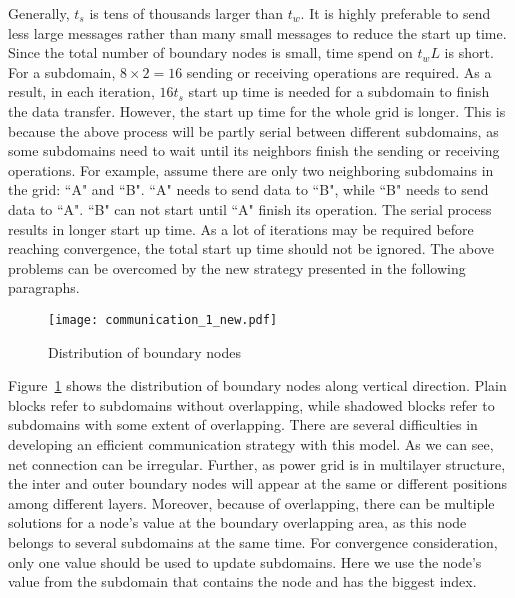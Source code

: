 \documentclass{sig-alternate}
\begin{document}
	Generally, $t_s$ is tens of thousands larger than $t_w$. It is highly preferable to send less 
	large messages rather than many small messages to reduce the start up time. Since the total number of boundary nodes is small, 
	time spend on $t_wL$ is short. For a subdomain, $8\times 2 = 
	16$ sending or receiving operations are required. As a result, in each iteration, $16t_s$ start up time is
	needed for a subdomain to finish the data transfer. However, the start up time for the whole grid is longer.
	This is because the above process will be partly serial between different subdomains, as some subdomains need to wait until
	its neighbors finish the sending or receiving operations. For example, 
	assume there are only two neighboring subdomains in the grid: ``A" and ``B". ``A" needs to send data to ``B", while ``B" needs
	to send data to ``A". ``B" can not start until ``A" finish its operation. The serial process results in 
	longer start up time. As a lot of iterations may be required before reaching convergence, the total 
	start up time should not be ignored. The above problems can be overcomed by the new strategy presented in the following paragraphs.

	\begin{figure}[htbp]
	  \centering
	  \texttt{[image: communication\_1\_new.pdf]}
	  \caption{Distribution of boundary nodes}
	  \label{comm}
	\end{figure}

	Figure~\ref{comm} shows the distribution of boundary nodes along vertical direction. Plain blocks refer to subdomains without 
	overlapping, while shadowed blocks refer to subdomains with some extent of overlapping. There are several difficulties in 
	developing an efficient communication strategy with this model. As we can see, net connection can be irregular. Further, 
	as power grid is in multilayer 
	structure, the inter and outer boundary nodes will appear at the same or different positions
	among different layers. Moreover, because of overlapping, there can be multiple solutions for a node's value at the boundary 
	overlapping area, as this node belongs to several subdomains at the same time. For convergence consideration, only one value 
	should be used to update subdomains. Here we use the node's value from the subdomain that contains the node and has the biggest 
	index.
\end{document}
